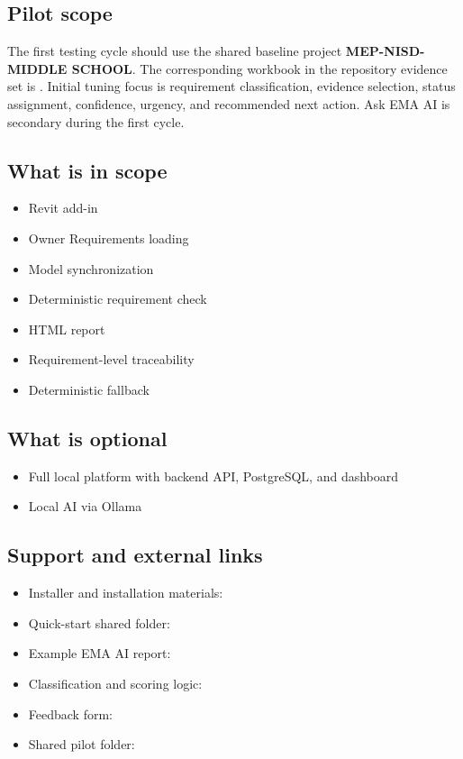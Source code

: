 \subsection*{Pilot scope}
The first testing cycle should use the shared baseline project \textbf{MEP-NISD-MIDDLE SCHOOL}. The corresponding workbook in the repository evidence set is . Initial tuning focus is requirement classification, evidence selection, status assignment, confidence, urgency, and recommended next action. Ask EMA AI is secondary during the first cycle.

\subsection*{What is in scope}
\begin{itemize}
  \item Revit add-in
  \item Owner Requirements loading
  \item Model synchronization
  \item Deterministic requirement check
  \item HTML report
  \item Requirement-level traceability
  \item Deterministic fallback
\end{itemize}

\subsection*{What is optional}
\begin{itemize}
  \item Full local platform with backend API, PostgreSQL, and dashboard
  \item Local AI via Ollama
\end{itemize}

\subsection*{Support and external links}
\begin{itemize}
  \item Installer and installation materials: 
  \item Quick-start shared folder: 
  \item Example EMA AI report: 
  \item Classification and scoring logic: 
  \item Feedback form: 
  \item Shared pilot folder: 
\end{itemize}
\clearpage
